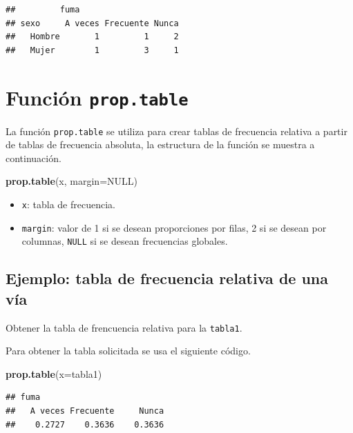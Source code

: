 \documentclass[10pt,]{krantz}
\makeatletter
\newenvironment{Shaded}{\begin{snugshade}}{\end{snugshade}}
\newcommand{\KeywordTok}[1]{\textcolor[rgb]{0.13,0.29,0.53}{\textbf{{#1}}}}
\newcommand{\DataTypeTok}[1]{\textcolor[rgb]{0.13,0.29,0.53}{{#1}}}
\newcommand{\OtherTok}[1]{\textcolor[rgb]{0.56,0.35,0.01}{{#1}}}
\newcommand{\NormalTok}[1]{{#1}}
\providecommand{\tightlist}{%
  \setlength{\itemsep}{0pt}\setlength{\parskip}{0pt}}
\newenvironment{kframe}{%
\medskip{}
\setlength{\fboxsep}{.8em}
 \def\at@end@of@kframe{}%
 \ifinner\ifhmode%
  \def\at@end@of@kframe{\end{minipage}}%
  \begin{minipage}{\columnwidth}%
 \fi\fi%
 \def\FrameCommand##1{\hskip\@totalleftmargin \hskip-\fboxsep
 \colorbox{shadecolor}{##1}\hskip-\fboxsep
     \hskip-\linewidth \hskip-\@totalleftmargin \hskip\columnwidth}%
 \MakeFramed {\advance\hsize-\width
   \@totalleftmargin\z@ \linewidth\hsize
   \@setminipage}}%
 {\par\unskip\endMakeFramed%
 \at@end@of@kframe}
\renewenvironment{Shaded}{\begin{kframe}}{\end{kframe}}
\makeatother
\begin{document}
\begin{verbatim}
##         fuma
## sexo     A veces Frecuente Nunca
##   Hombre       1         1     2
##   Mujer        1         3     1
\end{verbatim}

\section{\texorpdfstring{Función \texttt{prop.table}
}{Función prop.table }}\label{funcion-prop.table}

La función \texttt{prop.table} se utiliza para crear tablas de
frecuencia relativa a partir de tablas de frecuencia absoluta, la
estructura de la función se muestra a continuación.

\begin{Shaded}
\begin{Highlighting}[]
\KeywordTok{prop.table}\NormalTok{(x, }\DataTypeTok{margin=}\OtherTok{NULL}\NormalTok{)}
\end{Highlighting}
\end{Shaded}

\begin{itemize}
\tightlist
\item
  \texttt{x}: tabla de frecuencia.
\item
  \texttt{margin}: valor de 1 si se desean proporciones por filas, 2 si
  se desean por columnas, \texttt{NULL} si se desean frecuencias
  globales.
\end{itemize}

\subsection*{Ejemplo: tabla de frecuencia relativa de una
vía}\label{ejemplo-tabla-de-frecuencia-relativa-de-una-via}

Obtener la tabla de frencuencia relativa para la \texttt{tabla1}.

Para obtener la tabla solicitada se usa el siguiente código.

\begin{Shaded}
\begin{Highlighting}[]
\KeywordTok{prop.table}\NormalTok{(}\DataTypeTok{x=}\NormalTok{tabla1)}
\end{Highlighting}
\end{Shaded}

\begin{verbatim}
## fuma
##   A veces Frecuente     Nunca 
##    0.2727    0.3636    0.3636
\end{verbatim}
\end{document}
